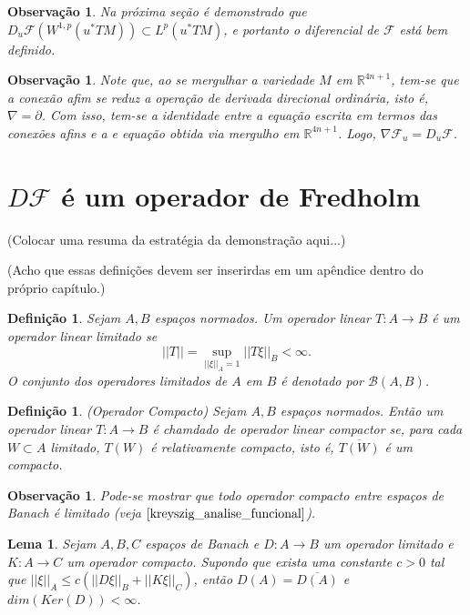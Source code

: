 \documentclass[12pt]{book}
\newtheorem{lema}[teorema]{Lema}
\newtheorem{definicao}[teorema]{Definição}
\newtheorem{observacao}[teorema]{Observação}
\newcommand{\diferencialfloerponto}[1]{D_{#1}\operadorFloer}
\newcommand{\espacoLp}[1]{L^{p}(#1)}
\newcommand{\espacosobolev}[1]{W^{1,p}(#1)}
\newcommand{\operadorFloer}{\mathcal{F}}
\newcommand{\norma}[1]{||#1||}
\newcommand{\normasubscrito}[2]{\norma{#1}_{#2}}
\newcommand{\operadoreslimitados}[2]{\mathcal{B}(#1, #2)}
\newcommand{\pullbackfibradotangente}[2]{#1^{*}T#2}
\newcommand{\pullbackfibradotangenteM}[1]{\pullbackfibradotangente{#1}{M}}
\newcommand{\real}[1]{\mathbb{R}^{#1}}
\newcommand{\alerta}[1]{{\color{red}#1}}
\begin{document}
	\begin{observacao}
		Na próxima seção é demonstrado que $\diferencialfloerponto{u}(\espacosobolev{\pullbackfibradotangenteM{u}})\subset \espacoLp{\pullbackfibradotangenteM{u}}$, e portanto o diferencial de $\operadorFloer$  está bem definido.
	\end{observacao}
	
	\begin{observacao}
		Note que, ao se mergulhar a variedade $M$ em $\real{4n+1}$, tem-se que a conexão afim se reduz a operação de derivada direcional ordinária, isto é,  $\nabla=\partial$. Com isso, tem-se a identidade entre a equação escrita em termos das conexões afins e a e equação obtida via mergulho em $\real{4n+1}$. Logo, $\nabla\operadorFloer_{u} = \diferencialfloerponto{u}$.
	\end{observacao}

	\section{$D\operadorFloer$ é um operador de Fredholm}
	\alerta{(Colocar uma resuma da estratégia da demonstração aqui...)}
	
	\alerta{(Acho que essas definições devem ser inserirdas em um apêndice dentro do próprio capítulo.)}
	
	\begin{definicao}
		Sejam $A,B$ espaços normados. Um operador linear $T:A\to B$ é um operador linear limitado se 
		$$
		\norma{T} = \sup_{\norma{\xi}_{A}=1}\norma{T\xi}_{B}<\infty.
		$$
		O conjunto dos operadores limitados de $A$ em $B$ é denotado por $\operadoreslimitados{A}{B}$.
	\end{definicao}
	
	\begin{definicao}\label{definicao_operador_compacto}
		(Operador Compacto) Sejam $A, B$ espaços normados. Então um operador linear $T:A\to B$ é chamdado de operador linear compactor se, para cada $W \subset A$ limitado, $T(W)$ é relativamente compacto, isto é, $\overline{T(W)} $ é um compacto.
	\end{definicao}
	
	\begin{observacao}\label{observacao_operador_compacto_limitado}
		Pode-se mostrar que todo operador compacto entre espaços de Banach é limitado (veja $\cite{kreyszig_analise_funcional}$).
	\end{observacao}
	
	\begin{lema}\label{lema_desigualdade_operador_compacto}
		Sejam $A,B,C$ espaços de Banach e $D:A\to B$ um operador limitado e $K:A \to C$ um operador compacto. Supondo que exista uma constante $c>0$ tal que $\normasubscrito{\xi}{A} \leq c(\normasubscrito{D\xi}{B} + \normasubscrito{K\xi}{C})$, então $D(A) = \overline{D(A)}$ e $dim(Ker(D)) <\infty$.
	\end{lema}
	
\end{document}
